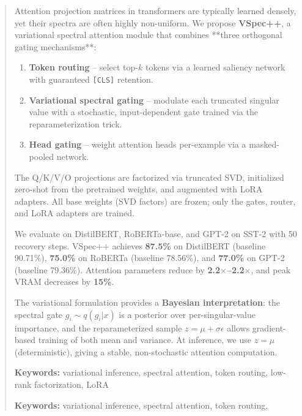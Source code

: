 \documentclass{article}
\begin{document}
\maketitle

\begin{abstract}
Attention projection matrices in transformers are typically learned densely, 
yet their spectra are often highly non-uniform. We propose \textbf{VSpec++}, a 
variational spectral attention module that combines **three orthogonal 
gating mechanisms**:

\begin{enumerate}
\item \textbf{Token routing} -- select top-$k$ tokens via a learned saliency network
  with guaranteed \texttt{[CLS]} retention.
\item \textbf{Variational spectral gating} -- modulate each truncated singular value
  with a stochastic, input-dependent gate trained via the reparameterization
  trick.
\item \textbf{Head gating} -- weight attention heads per-example via a masked-pooled
  network.

\end{enumerate}
The Q/K/V/O projections are factorized via truncated SVD, initialized 
zero-shot from the pretrained weights, and augmented with LoRA adapters. 
All base weights (SVD factors) are frozen; only the gates, router, and LoRA 
adapters are trained.

We evaluate on DistilBERT, RoBERTa-base, and GPT-2 on SST-2 with 
50 recovery steps. VSpec++ achieves \textbf{87.5\%} on 
DistilBERT (baseline 90.71\%), \textbf{75.0\%} on RoBERTa (baseline 
78.56\%), and \textbf{77.0\%} on GPT-2 (baseline 79.36\%). Attention 
parameters reduce by \textbf{2.2$\times$--2.2$\times$}, and peak VRAM decreases 
by \textbf{15\%}.

The variational formulation provides a \textbf{Bayesian interpretation}: the 
spectral gate $g_i \sim q(g_i | x)$ is a posterior over per-singular-value 
importance, and the reparameterized sample $z = \mu + \sigma \epsilon$ 
allows gradient-based training of both mean and variance. At inference, we 
use $z = \mu$ (deterministic), giving a stable, non-stochastic attention 
computation.

\textbf{Keywords:} variational inference, spectral attention, token routing, 
low-rank factorization, LoRA



\vspace{0.5em}
\noindent\textbf{Keywords:} variational inference, spectral attention, token routing,
\end{abstract}
\end{document}
